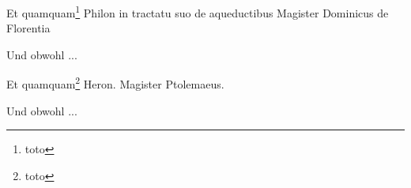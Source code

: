 \documentclass{book}
\begin{document}
\begin{ledgroup}

\begin{pairs}
\begin{Leftside}
\beginnumbering
\pstart
Et quamquam\footnote{toto} Philon in tractatu suo de aqueductibus Magister Dominicus de Florentia
\pend
\endnumbering
\end{Leftside}

\begin{Rightside}
\beginnumbering
\pstart
Und obwohl ...
\pend
\endnumbering
\end{Rightside}

\end{pairs}
\Columns
\end{ledgroup}




\begin{ledgroup}
\setcounter{footnoteC}{0}
\setcounter{footnote}{0}
\begin{pairs}
\begin{Leftside}
\beginnumbering
\pstart
Et quamquam\footnote{toto} Heron. Magister Ptolemaeus.
\pend
\endnumbering
\end{Leftside}

\begin{Rightside}
\beginnumbering
\pstart
Und obwohl ...
\pend
\endnumbering
\end{Rightside}

\end{pairs}
\Columns
\end{ledgroup}
\end{document}
